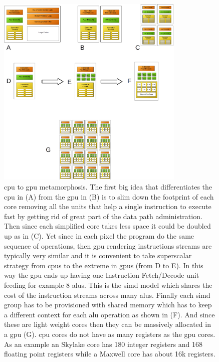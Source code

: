\documentclass[11pt,a4paper]{article}
\begin{document}
\begin{figure}[h!]
    \centering
    \includegraphics[width=0.8\textwidth]{CPU_to_GPU_metamorphosis.png}
    \caption{\gls{cpu} to \gls{gpu} metamorphosis. The first big idea that differentiates the \gls{cpu} in (A) from the \gls{gpu} in (B) is to slim down the footprint of each core removing all the units that help a single instruction to execute fast by getting rid of great part of the data path administration. Then since each simplified core takes less space it could be doubled up as in (C). Yet since in each pixel the program do the same sequence of operations, then \gls{gpu} rendering instructions streams are typically very similar and it is convenient to take superscalar strategy from \glspl{cpu} to the extreme in \glspl{gpu} (from D to E). In this way the \gls{gpu} ends up having one Instruction Fetch/Decode unit feeding for example 8 \glspl{alu}. This is the \gls{simd} model which shares the cost of the instruction streams across many \glspl{alu}. Finally each \gls{simd} group has to be provisioned with shared memory which has to keep a different context for each \gls{alu} operation as shown in (F). And since these are light weight cores then they can be massively allocated in a \gls{gpu} (G). \gls{cpu} cores do not have as many registers as the \gls{gpu} cores. As an example an Skylake core has 180 integer registers and 168 floating point registers while a Maxwell core has about 16k registers.}
    \label{fig:CPU_to_GPU_metamorphosis}
\end{figure}
\end{document}
